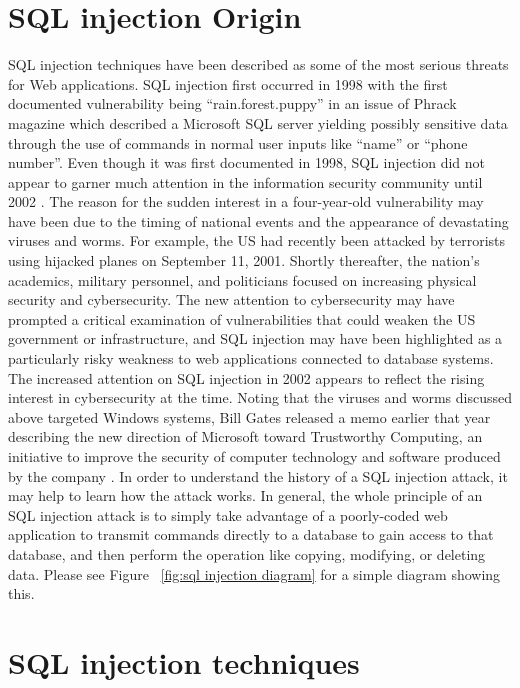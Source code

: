 \section{SQL injection Origin}
\label{sec: sql injection origin}

SQL injection techniques have been described as some of the most serious threats for Web applications. SQL injection first occurred in 1998 with the first documented vulnerability being “rain.forest.puppy” in an issue of Phrack magazine which described a Microsoft SQL server yielding possibly sensitive data through the use of commands in normal user inputs like “name” or “phone number”.
Even though it was first documented in 1998, SQL injection did not appear to garner much attention in the information security community until 2002 \cite{ryder2010sql}. 
The reason for the sudden interest in a four-year-old vulnerability may have been due to the timing of national events and the appearance of devastating viruses and worms. For example, the US had recently been attacked by terrorists using hijacked planes on September 11, 2001. Shortly thereafter, the nation’s academics, military personnel, and politicians focused on increasing physical security and cybersecurity. The new attention to cybersecurity may have prompted a critical examination of vulnerabilities that could weaken the US government or infrastructure, and SQL injection may have been highlighted as a particularly risky weakness to web applications connected to database systems. The increased attention on SQL injection in 2002 appears to reflect the rising interest in cybersecurity at the time. Noting that the viruses and worms discussed above targeted Windows systems, Bill Gates released a memo earlier that year describing the new direction of Microsoft toward Trustworthy Computing, an initiative to improve the security of computer technology and software produced by the company \cite{sun2007classification}.
In order to understand the history of a SQL injection attack, it may help to learn how the attack works. In general, the whole principle of an SQL injection attack is to simply take advantage of a poorly-coded web application to transmit commands directly to a database to gain access to that database, and then perform the operation like copying, modifying, or deleting data. Please see Figure ~\ref{fig:sql injection diagram} for a simple diagram showing this.


\section{SQL injection techniques}
\label{sec:sql injection techniques}


